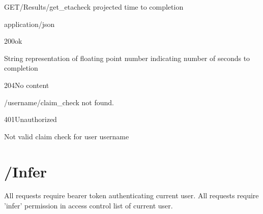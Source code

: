 \documentclass[12pt, etter]{article}
\begin{document}
\begin{apiRoute}{GET}{/Results/get\_eta}{check projected time to completion}
    \begin{routeParameter}
    \end{routeParameter}
    \begin{routeResponse}{application/json}
        \begin{routeResponseItem}{200}{ok}
            \begin{routeResponseItemBody}
                String representation of floating point number indicating number of seconds to completion
            \end{routeResponseItemBody}
        \end{routeResponseItem}
        \begin{routeResponseItem}{204}{No content}
            \begin{routeResponseItemBody}
                /{username}/{claim_check} not found.
            \end{routeResponseItemBody}
        \end{routeResponseItem}
        \begin{routeResponseItem}{401}{Unauthorized}
            \begin{routeResponseItemBody}
                Not valid claim check for user {username}
            \end{routeResponseItemBody}
        \end{routeResponseItem}
    \end{routeResponse}
\end{apiRoute}

\section{/Infer}
All requests require bearer token authenticating current user.
All requests require 'infer' permission in access control list of current user.
\end{document}

